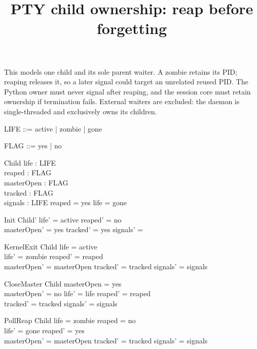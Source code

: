 \documentclass[a4paper,10pt]{article}
\begin{document}
\title{PTY child ownership: reap before forgetting}
\maketitle

This models one child and its sole parent waiter. A zombie retains its PID;
reaping releases it, so a later signal could target an unrelated reused PID.
The Python owner must never signal after reaping, and the session core must
retain ownership if termination fails. External waiters are excluded: the
daemon is single-threaded and exclusively owns its children.

\begin{zed}
LIFE ::= active | zombie | gone
\end{zed}
\begin{zed}
FLAG ::= yes | no
\end{zed}
\begin{schema}{Child}
life : LIFE \\
reaped : FLAG \\
masterOpen : FLAG \\
tracked : FLAG \\
signals : \power LIFE
\where
reaped = yes \implies life = gone
\end{schema}
\begin{schema}{Init}
Child'
\where
life' = active \land reaped' = no \\
masterOpen' = yes \land tracked' = yes \land signals' = \emptyset
\end{schema}
\begin{schema}{KernelExit}
\Delta Child
\where
life = active \\
life' = zombie \land reaped' = reaped \\
masterOpen' = masterOpen \land tracked' = tracked \land signals' = signals
\end{schema}
\begin{schema}{CloseMaster}
\Delta Child
\where
masterOpen = yes \\
masterOpen' = no \land life' = life \land reaped' = reaped \\
tracked' = tracked \land signals' = signals
\end{schema}
\begin{schema}{PollReap}
\Delta Child
\where
life = zombie \land reaped = no \\
life' = gone \land reaped' = yes \\
masterOpen' = masterOpen \land tracked' = tracked \land signals' = signals
\end{schema}
\end{document}
